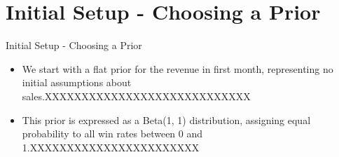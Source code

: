 \section{Initial Setup - Choosing a Prior}

\begin{frame}{Initial Setup - Choosing a Prior}

  \begin{itemize}
    \item We start with a flat prior for the revenue in first month, representing no initial assumptions about sales.XXXXXXXXXXXXXXXXXXXXXXXXXXXX
    \item This prior is expressed as a Beta(1, 1) distribution, assigning equal probability to all win rates between 0 and 1.XXXXXXXXXXXXXXXXXXXXXXX
  \end{itemize}
  
\end{frame}

